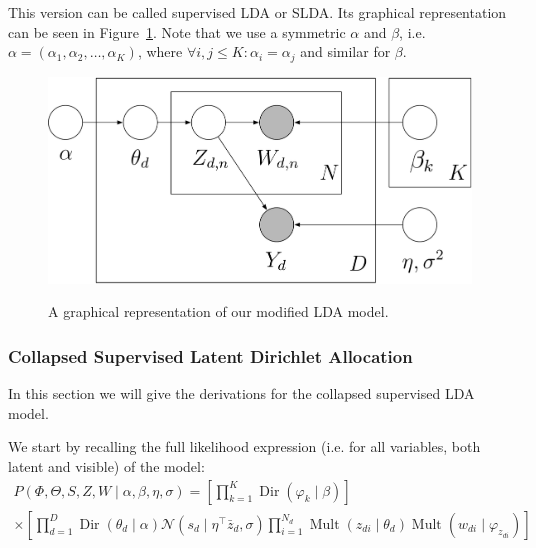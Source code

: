 \documentclass[a4paper,10pt]{article}
\DeclareMathOperator{\Dir}{Dir}
\DeclareMathOperator{\Mult}{Mult}
\renewcommand{\phi}{\varphi}
\begin{document}
This version can be called supervised LDA or SLDA.
Its graphical representation can be seen in Figure~\ref{fig:SLDA}.
Note that we use a symmetric $\alpha$ and $\beta$, i.e. $\alpha=(\alpha_1, \alpha_2, \dots, \alpha_K)$, where $\forall i,j \leq K: \alpha_i = \alpha_j$ and similar for $\beta$.

\begin{figure}[ht!]
  \centering
  \includegraphics[width=\textwidth]{SLDA.png}
  \label{fig:SLDA}
  \caption{A graphical representation of our modified LDA model.}
\end{figure}

\subsubsection{Collapsed Supervised Latent Dirichlet Allocation}
In this section we will give the derivations for the collapsed supervised LDA model.

We start by recalling the full likelihood expression (i.e. for all variables, both latent and visible) of the model:
\begin{equation}
\label{eq:prodpart}
\begin{gathered}
P(\Phi, \Theta, S, Z, W \mid \alpha, \beta, \eta, \sigma) = \left[ \prod_{k = 1}^K \Dir(\phi_k \mid \beta) \right]  \\
\times \left[ \prod_{d = 1}^D \Dir(\theta_d \mid \alpha) \mathcal{N}(s_d \mid \eta^\top \bar{z}_d, \sigma) \prod_{i = 1}^{N_d} \Mult(z_{di} \mid \theta_d) \Mult(w_{di} \mid \varphi_{z_{di}}) \right]
\end{gathered}
\end{equation}

\end{document}

